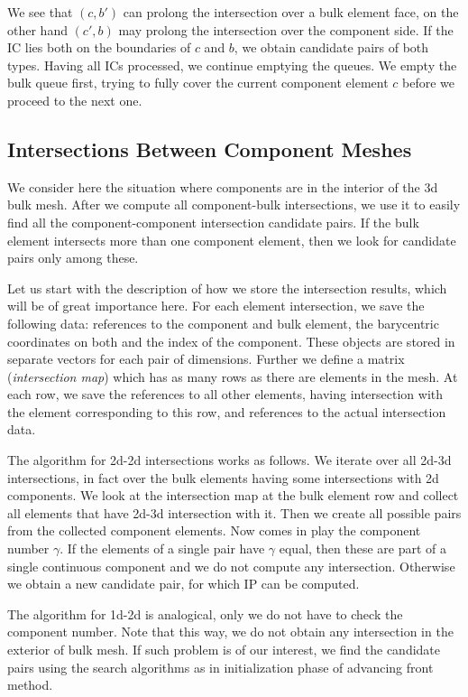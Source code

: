 We see that $(c, b')$ can prolong the intersection over a bulk element face, on the other hand $(c', b)$ 
may prolong the intersection over the component side. If the IC lies both on the boundaries of $c$ and $b$,
we obtain candidate pairs of both types. Having all ICs processed, we continue emptying the queues. We empty the bulk queue first,
trying to fully cover the current component element $c$ before we proceed to the next one. 

\subsection{Intersections Between Component Meshes}
\label{sec:components}
We consider here the situation where components are in the interior of the 3d bulk mesh. After we compute
all component-bulk intersections, we use it to easily find all the component-component intersection candidate
pairs.
If the bulk element intersects more than one component element, then we look for candidate pairs only among these.

Let us start with the description of how we store the intersection results, which will be of great importance here.
For each element intersection, we save the following data: references to the component and bulk element, 
the barycentric coordinates on both and the index of the component. These objects are stored in separate vectors for each pair of dimensions. Further we define a matrix (\emph{intersection map}) which has as many rows as there are elements in the mesh.
At each row, we save the references to all other elements, having intersection with the element corresponding to this row, and references to the actual intersection data.

The algorithm for 2d-2d intersections works as follows. We iterate over all 2d-3d intersections, in fact over
the bulk elements having some intersections with 2d components. We look at the intersection map at the
bulk element row and collect all elements that have 2d-3d intersection with it.
Then we create all possible pairs from the collected component elements.
Now comes in play the component number $\gamma$. If the elements of a single pair have $\gamma$ equal, then 
these are part of a single continuous component and we do not compute any intersection.
Otherwise we obtain a new candidate pair, for which IP can be computed.

The algorithm for 1d-2d is analogical, only we do not have to check the component number.
Note that this way, we do not obtain any intersection in the exterior of bulk mesh.
If such problem is of our interest, we find the candidate pairs using the search algorithms as in
initialization phase of advancing front method.


